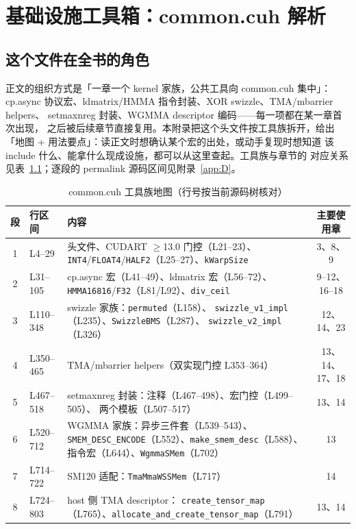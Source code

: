 \chapter{基础设施工具箱：common.cuh 解析}\label{app:A}

\section{这个文件在全书的角色}

正文的组织方式是「一章一个 kernel 家族，公共工具向 common.cuh 集中」：
cp.async 协议宏、ldmatrix/HMMA 指令封装、XOR swizzle、TMA/mbarrier helpers、
setmaxnreg 封装、WGMMA descriptor 编码——每一项都在某一章首次出现，
之后被后续章节直接复用。本附录把这个头文件按工具族拆开，给出
「地图 + 用法要点」：读正文时想确认某个宏的出处，或动手复现时想知道
该 include 什么、能拿什么现成设施，都可以从这里查起。工具族与章节的
对应关系见表~\ref{tab:appA-map}；逐段的 permalink 源码区间见附录~\ref{app:D}。

\begin{table}[htbp]
\centering\small
\caption{common.cuh 工具族地图（行号按当前源码树核对）}\label{tab:appA-map}
\begin{tabular}{clp{4.9cm}c}
\toprule
段 & 行区间 & 内容 & 主要使用章 \\
\midrule
1 & L4--29 & 头文件、CUDART $\ge$13.0 门控（L21--23）、
  \texttt{INT4}/\texttt{FLOAT4}/\texttt{HALF2}（L25--27）、\texttt{kWarpSize} & 3、8、9 \\
2 & L31--105 & cp.async 宏（L41--49）、ldmatrix 宏（L56--72）、
  \texttt{HMMA16816}/\texttt{F32}（L81/L92）、\texttt{div\_ceil} & 9--12、16--18 \\
3 & L110--348 & swizzle 家族：\texttt{permuted}（L158）、
  \texttt{swizzle\_\allowbreak{}v1\_\allowbreak{}impl}（L235）、\texttt{SwizzleBMS}（L287）、
  \texttt{swizzle\_\allowbreak{}v2\_\allowbreak{}impl}（L326） & 12、14、23 \\
4 & L350--465 & TMA/mbarrier helpers（双实现门控 L353--364） & 13、14、17、18 \\
5 & L467--518 & setmaxnreg 封装：注释（L467--498）、宏门控（L499--505）、
  两个模板（L507--517） & 13、14 \\
6 & L520--712 & WGMMA 家族：异步三件套（L539--543）、
  \texttt{SMEM\_\allowbreak{}DESC\_\allowbreak{}ENCODE}（L552）、\texttt{make\_\allowbreak{}smem\_\allowbreak{}desc}（L588）、
  指令宏（L644）、\texttt{WgmmaSMem}（L702） & 13 \\
7 & L714--722 & SM120 适配：\texttt{Tma\allowbreak{}Mma\allowbreak{}WSSMem}（L717） & 14 \\
8 & L724--803 & host 侧 TMA descriptor：
  \texttt{create\_\allowbreak{}tensor\_\allowbreak{}map}（L765）、\texttt{allocate\_\allowbreak{}and\_\allowbreak{}create\_\allowbreak{}tensor\_\allowbreak{}map}（L791） & 13、14 \\
\bottomrule
\end{tabular}
\end{table}

